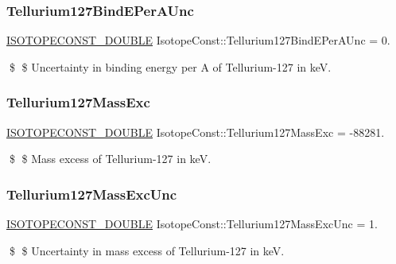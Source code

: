 \subsubsection{\texorpdfstring{Tellurium127\+Bind\+E\+Per\+A\+Unc}{Tellurium127BindEPerAUnc}}
{\footnotesize\ttfamily \mbox{\hyperlink{group___isotope_const-_macros_ga8f45a7272ce02c0b4c65c44636ed719a}{I\+S\+O\+T\+O\+P\+E\+C\+O\+N\+S\+T\+\_\+\+D\+O\+U\+B\+LE}} Isotope\+Const\+::\+Tellurium127\+Bind\+E\+Per\+A\+Unc = 0.}

\$ \$ Uncertainty in binding energy per A of Tellurium-\/127 in keV. \mbox{\label{group___isotope_const-_tellurium-_te127_gabc1b0c9001e606d6c6a1080981ade508}} 
\subsubsection{\texorpdfstring{Tellurium127\+Mass\+Exc}{Tellurium127MassExc}}
{\footnotesize\ttfamily \mbox{\hyperlink{group___isotope_const-_macros_ga8f45a7272ce02c0b4c65c44636ed719a}{I\+S\+O\+T\+O\+P\+E\+C\+O\+N\+S\+T\+\_\+\+D\+O\+U\+B\+LE}} Isotope\+Const\+::\+Tellurium127\+Mass\+Exc = -\/88281.}

\$ \$ Mass excess of Tellurium-\/127 in keV. \mbox{\label{group___isotope_const-_tellurium-_te127_gaf3ca040aa48b8a66a06a8680f0ac1fbe}} 
\subsubsection{\texorpdfstring{Tellurium127\+Mass\+Exc\+Unc}{Tellurium127MassExcUnc}}
{\footnotesize\ttfamily \mbox{\hyperlink{group___isotope_const-_macros_ga8f45a7272ce02c0b4c65c44636ed719a}{I\+S\+O\+T\+O\+P\+E\+C\+O\+N\+S\+T\+\_\+\+D\+O\+U\+B\+LE}} Isotope\+Const\+::\+Tellurium127\+Mass\+Exc\+Unc = 1.}

\$ \$ Uncertainty in mass excess of Tellurium-\/127 in keV. \mbox{\label{group___isotope_const-_tellurium-_te127_ga84432be42f5111ba4afd2978992ddad3}} 
